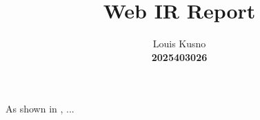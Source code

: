 \documentclass[12pt,a4paper]{article}
\begin{document}
\title{Web IR Report}
\author{Louis Kusno \\
	\textbf{2025403026}}
\date{}
\maketitle


\tableofcontents
\clearpage








As shown in \cite{einstein1905}, ...


\end{document}
